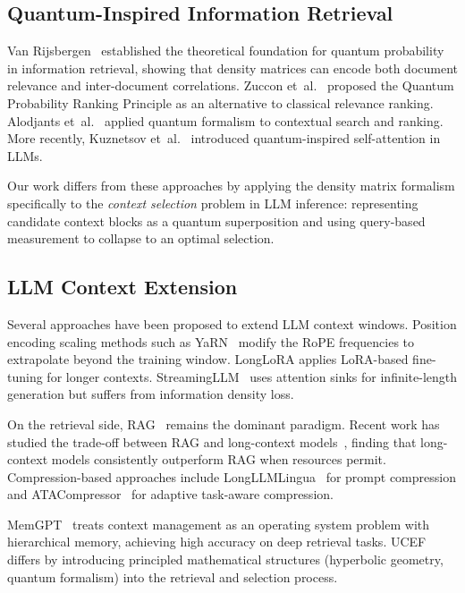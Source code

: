 \documentclass[11pt,a4paper]{article}
\newcommand{\ucef}{\textsf{UCEF}}
\begin{document}
\subsection{Quantum-Inspired Information Retrieval}

Van Rijsbergen~\citep{vanrijsbergen2004} established the theoretical
foundation for quantum probability in information retrieval, showing that
density matrices can encode both document relevance and inter-document
correlations.  Zuccon et~al.~\citep{zuccon2009} proposed the Quantum
Probability Ranking Principle as an alternative to classical relevance
ranking.  Alodjants et~al.~\citep{alodjants2024quantum} applied quantum
formalism to contextual search and ranking.  More recently, Kuznetsov
et~al.~\citep{kuznetsov2026qisa} introduced quantum-inspired self-attention
in LLMs.

Our work differs from these approaches by applying the density matrix
formalism specifically to the \emph{context selection} problem in LLM
inference: representing candidate context blocks as a quantum superposition
and using query-based measurement to collapse to an optimal selection.

\subsection{LLM Context Extension}

Several approaches have been proposed to extend LLM context windows.
Position encoding scaling methods such as
YaRN~\citep{peng2024yarn} modify the RoPE frequencies to extrapolate beyond
the training window.  LongLoRA applies LoRA-based fine-tuning for longer
contexts.  StreamingLLM~\citep{xiao2024streamingllm} uses attention sinks
for infinite-length generation but suffers from information density loss.

On the retrieval side, RAG~\citep{lewis2020rag} remains the dominant
paradigm.  Recent work has studied the trade-off between RAG and long-context
models~\citep{li2024ragvslc}, finding that long-context models consistently
outperform RAG when resources permit.  Compression-based approaches include
LongLLMLingua~\citep{jiang2024longllmlingua} for prompt compression and
ATACompressor~\citep{li2026ata} for adaptive task-aware compression.

MemGPT~\citep{packer2024memgpt} treats context management as an operating
system problem with hierarchical memory, achieving high accuracy on deep
retrieval tasks.  \ucef{} differs by introducing principled mathematical
structures (hyperbolic geometry, quantum formalism) into the retrieval and
selection process.
\end{document}
